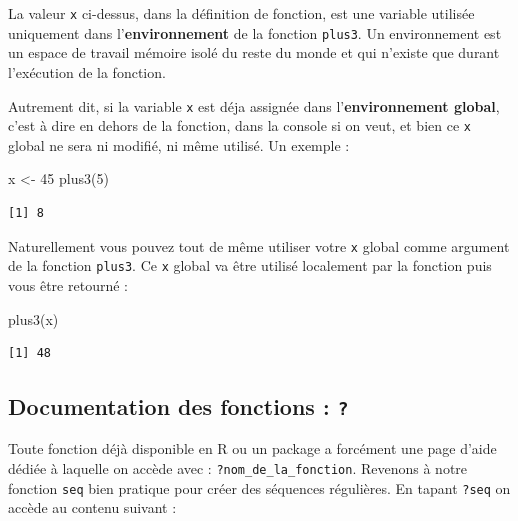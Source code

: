 \documentclass[
  letterpaper,
  DIV=11,
  numbers=noendperiod]{scrreprt}
\newenvironment{Shaded}{\begin{snugshade}}{\end{snugshade}}
\newcommand{\DecValTok}[1]{\textcolor[rgb]{0.68,0.00,0.00}{#1}}
\newcommand{\FunctionTok}[1]{\textcolor[rgb]{0.28,0.35,0.67}{#1}}
\newcommand{\NormalTok}[1]{\textcolor[rgb]{0.00,0.23,0.31}{#1}}
\newcommand{\OtherTok}[1]{\textcolor[rgb]{0.00,0.23,0.31}{#1}}
\begin{document}
La valeur \texttt{x} ci-dessus, dans la définition de fonction, est une
variable utilisée uniquement dans l'\textbf{environnement} de la
fonction \texttt{plus3}. Un environnement est un espace de travail
mémoire isolé du reste du monde et qui n'existe que durant l'exécution
de la fonction.

Autrement dit, si la variable \texttt{x} est déja assignée dans
l'\textbf{environnement global}, c'est à dire en dehors de la fonction,
dans la console si on veut, et bien ce \texttt{x} global ne sera ni
modifié, ni même utilisé. Un exemple :

\begin{Shaded}
\begin{Highlighting}[]
\NormalTok{x }\OtherTok{\textless{}{-}} \DecValTok{45}
\FunctionTok{plus3}\NormalTok{(}\DecValTok{5}\NormalTok{)}
\end{Highlighting}
\end{Shaded}

\begin{verbatim}
[1] 8
\end{verbatim}

Naturellement vous pouvez tout de même utiliser votre \texttt{x} global
comme argument de la fonction \texttt{plus3}. Ce \texttt{x} global va
être utilisé localement par la fonction puis vous être retourné :

\begin{Shaded}
\begin{Highlighting}[]
\FunctionTok{plus3}\NormalTok{(x)}
\end{Highlighting}
\end{Shaded}

\begin{verbatim}
[1] 48
\end{verbatim}

\hypertarget{documentation-des-fonctions}{%
\subsection{\texorpdfstring{Documentation des fonctions :
\texttt{?}}{Documentation des fonctions : ?}}\label{documentation-des-fonctions}}

Toute fonction déjà disponible en R ou un package a forcément une page
d'aide dédiée à laquelle on accède avec :
\texttt{?nom\_de\_la\_fonction}. Revenons à notre fonction \texttt{seq}
bien pratique pour créer des séquences régulières. En tapant
\texttt{?seq} on accède au contenu suivant :
\end{document}
